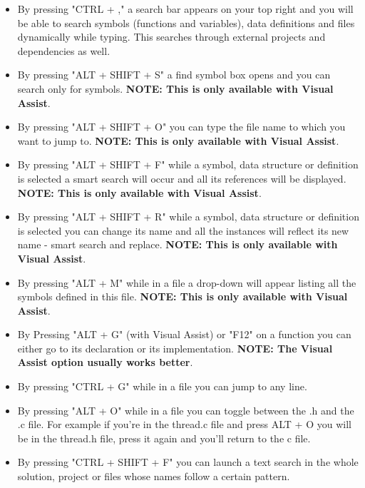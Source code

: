 \begin{appendices}
\begin{itemize}
	\item By pressing "CTRL + ," a search bar appears on your top right and you will be able to
search symbols (functions and variables), data definitions and files dynamically while typing. This
searches through external projects and dependencies as well.

	\item By pressing "ALT + SHIFT + S" a find symbol box opens and you can search only for symbols.
\textbf{NOTE: This is only available with Visual Assist}.

	\item By pressing "ALT + SHIFT + O" you can type the file name to which you want to jump to.
\textbf{NOTE: This is only available with Visual Assist}.

	\item By pressing "ALT + SHIFT + F" while a symbol, data structure or definition is selected
a smart search will occur and all its references will be displayed. \textbf{NOTE: This is only
available with Visual Assist}.

	\item By pressing "ALT + SHIFT + R" while a symbol, data structure or definition is selected
you can change its name and all the instances will reflect its new name - smart search and replace.
\textbf{NOTE: This is only available with Visual Assist}.

	\item By pressing "ALT + M" while in a file a drop-down will appear listing all the symbols
defined in this file. \textbf{NOTE: This is only available with Visual Assist}.

	\item By Pressing "ALT + G" (with Visual Assist) or "F12" on a function you can either go to
its declaration or its implementation. \textbf{NOTE: The Visual Assist option usually works better}.

	\item By pressing "CTRL + G" while in a file you can jump to any line.

	\item By pressing "ALT + O" while in a file you can toggle between the .h and the .c file. For
example if you're in the thread.c file and press ALT + O you will be in the thread.h file, press it
again and you'll return to the c file.

	\item By pressing "CTRL + SHIFT + F" you can launch a text search in the whole solution, project
or files whose names follow a certain pattern.


\end{itemize}
\end{appendices}
